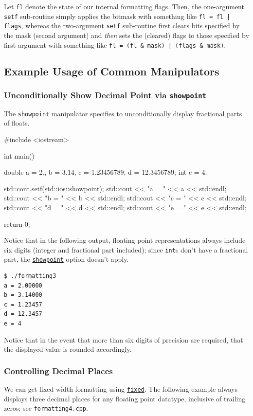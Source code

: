 \documentclass[12pt,letterpaper,twoside]{article}
\begin{document}
Let \texttt{fl} denote the state of our internal formatting flags.
Then, the one-argument \texttt{setf} sub-routine simply applies the 
bitmask with something like
\texttt{fl = fl | flags}, whereas the two-argument \texttt{setf} 
sub-routine first clears bits specified by the mask (second argument) 
and \emph{then} sets the (cleared) flags to those specified by first argument
 with something like \newline
\texttt{fl = (fl \& \tilde mask) | (flags \& mask)}.

\subsection{Example Usage of Common Manipulators}
\subsubsection{Unconditionally Show Decimal Point via \texttt{showpoint}}
The \texttt{showpoint} manipulator specifies to unconditionally display fractional parts 
of floats.

\begin{cpp}
#include <iostream>

int main() {
  double a = 2., b = 3.14, c = 1.23456789, d = 12.3456789;
  int e = 4;

  std::cout.setf(std::ios::showpoint);
  std::cout << "a = " << a << std::endl;
  std::cout << "b = " << b << std::endl;
  std::cout << "c = " << c << std::endl;
  std::cout << "d = " << d << std::endl;
  std::cout << "e = " << e << std::endl;

  return 0;
}
\end{cpp}

Notice that in the following output, floating point representations always include six 
digits (integer and fractional part included); since \texttt{int}s don't have a fractional
part, the \href{https://en.cppreference.com/w/cpp/io/manip/showpoint}{\texttt{showpoint}} 
option doesn't apply.

\begin{verbatim}
$ ./formatting3
a = 2.00000 
b = 3.14000 
c = 1.23457 
d = 12.3457 
e = 4 \end{verbatim}

Notice that in the event that more than six digits of precision are required, that
the displayed value is rounded accordingly.

\subsubsection{Controlling Decimal Places}
We can get fixed-width formatting using 
\href{https://en.cppreference.com/w/cpp/io/manip/fixed}{\texttt{fixed}}. The following 
example always displays three decimal places for any floating point datatype, inclusive
of trailing zeros; see \texttt{formatting4.cpp}.
\end{document}
